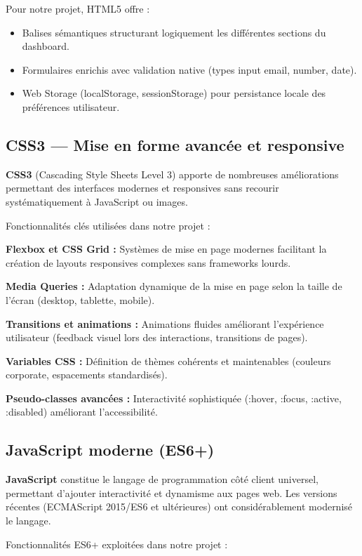 Pour notre projet, HTML5 offre :
\begin{itemize}
    \item Balises sémantiques structurant logiquement les différentes sections du dashboard.
    \item Formulaires enrichis avec validation native (types input email, number, date).
    \item Web Storage (localStorage, sessionStorage) pour persistance locale des préférences utilisateur.
\end{itemize}

\subsection{CSS3 — Mise en forme avancée et responsive}

\textbf{CSS3} (Cascading Style Sheets Level 3) apporte de nombreuses améliorations permettant des interfaces modernes et responsives sans recourir systématiquement à JavaScript ou images.


Fonctionnalités clés utilisées dans notre projet :

\textbf{Flexbox et CSS Grid :} Systèmes de mise en page modernes facilitant la création de layouts responsives complexes sans frameworks lourds.

\textbf{Media Queries :} Adaptation dynamique de la mise en page selon la taille de l'écran (desktop, tablette, mobile).

\textbf{Transitions et animations :} Animations fluides améliorant l'expérience utilisateur (feedback visuel lors des interactions, transitions de pages).

\textbf{Variables CSS :} Définition de thèmes cohérents et maintenables (couleurs corporate, espacements standardisés).

\textbf{Pseudo-classes avancées :} Interactivité sophistiquée (:hover, :focus, :active, :disabled) améliorant l'accessibilité.

\subsection{JavaScript moderne (ES6+)}

\textbf{JavaScript} constitue le langage de programmation côté client universel, permettant d'ajouter interactivité et dynamisme aux pages web. Les versions récentes (ECMAScript 2015/ES6 et ultérieures) ont considérablement modernisé le langage.

Fonctionnalités ES6+ exploitées dans notre projet :

